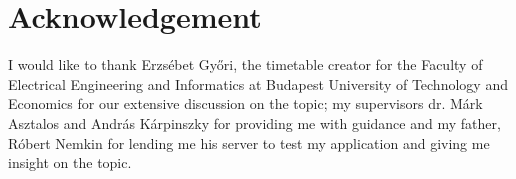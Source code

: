 \chapter*{Acknowledgement}

I would like to thank Erzsébet Győri, the timetable creator for the Faculty of Electrical Engineering and Informatics at Budapest University of Technology and Economics for our extensive discussion on the topic; my supervisors dr. Márk Asztalos and András Kárpinszky for providing me with guidance and my father, Róbert Nemkin for lending me his server to test my application and giving me insight on the topic.

